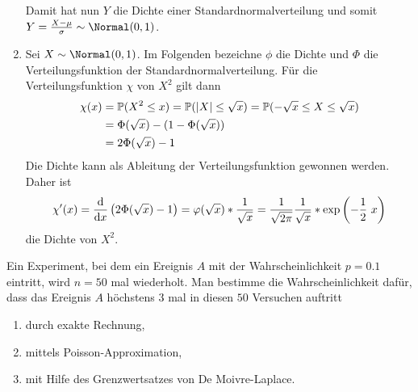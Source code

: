 \begin{exercisePage}[Normalverteilung]
\begin{enumerate}[label=(zu \alph*), leftmargin=*]
\begin{equation*}
		\end{equation*}
		Damit hat nun $Y$ die Dichte einer Standardnormalverteilung und somit $Y = \frac{X-\mu}{\sigma} \sim \Normal(0,1)$.
		\item Sei $X \sim \Normal(0,1)$. Im Folgenden bezeichne $\phi$ die Dichte und $\Phi$ die Verteilungsfunktion der Standardnormalverteilung. Für die Verteilungsfunktion $\chi$ von $X^2$ gilt dann
		\begin{equation*}
		\begin{aligned}
			\chi(x) 
			&= \mathbb{P}(X^2 \le x) = \mathbb{P}(\left| X \right| \le \sqrt{x}) = \mathbb{P}(-\sqrt{x} \le X \le \sqrt{x}) \\
			&= \Phi(\sqrt{x}) - (1 - \Phi(\sqrt{x})) \\
			&= 2 \Phi(\sqrt{x}) - 1
		\end{aligned}
		\end{equation*}
		Die Dichte kann als Ableitung der Verteilungsfunktion gewonnen werden. Daher ist
		\begin{equation*}
			\chi'(x) = \frac{\mathrm{d}}{\mathrm{d} x } \left( 2\Phi(\sqrt{x}) - 1  \right) = \varphi(\sqrt{x}) * \frac{1}{\sqrt{x}} = \frac{1}{\sqrt{2\pi}} \frac{1}{\sqrt{x}} * \exp \left(-\frac{1}{2} \ x \right)
		\end{equation*}
		die Dichte von $X^2$.
	\end{enumerate}


	\begin{homework}
		Ein Experiment, bei dem ein Ereignis $A$ mit der Wahrscheinlichkeit $p = 0.1$ eintritt, wird $n = 50$ mal wiederholt. Man bestimme die Wahrscheinlichkeit dafür, dass das Ereignis $A$ höchstens $3$ mal
		in diesen $50$ Versuchen auftritt
		\begin{enumerate}[leftmargin=*, nolistsep, topsep=-\parskip]
			\item durch exakte Rechnung,
			\item mittels Poisson-Approximation,
			\item mit Hilfe des Grenzwertsatzes von De Moivre-Laplace.
		\end{enumerate}
	\end{homework}


\end{exercisePage}
